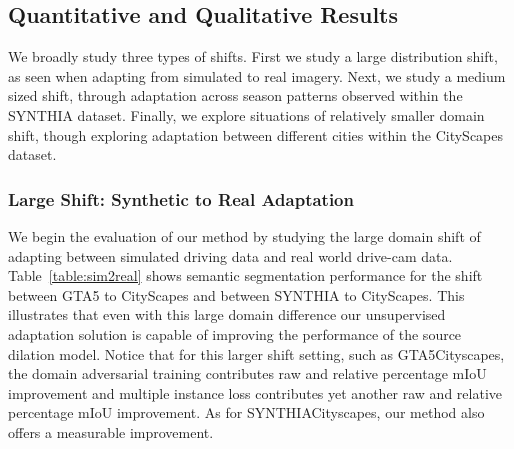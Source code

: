 \documentclass[10pt,twocolumn,letterpaper]{article}
\begin{document}
\subsection{Quantitative and Qualitative Results}

We broadly study three types of shifts. First we study a large distribution shift, as seen when adapting from simulated to real imagery. Next, we study a medium sized shift, through adaptation across season patterns observed within the SYNTHIA dataset. Finally, we explore situations of relatively smaller domain shift, though exploring adaptation between different cities within the CityScapes dataset.

\subsubsection{Large Shift: Synthetic to Real Adaptation}
We begin the evaluation of our method by studying the large domain shift of adapting between simulated driving data and real world drive-cam data. Table~\ref{table:sim2real} shows semantic segmentation performance for the shift between GTA5 to CityScapes and between SYNTHIA to CityScapes. This illustrates that even with this large domain difference our unsupervised adaptation solution is capable of improving the performance of the source dilation model. Notice that for this larger shift setting, such as GTA5Cityscapes, the domain adversarial training contributes  raw and  relative percentage mIoU improvement and multiple instance loss contributes yet another  raw and  relative percentage mIoU improvement. 
As for SYNTHIACityscapes, our method also offers a measurable improvement.
\end{document}

